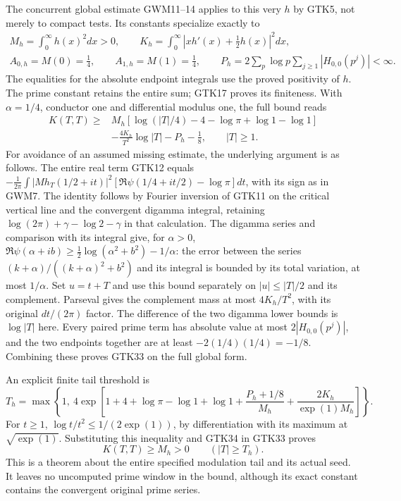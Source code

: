 The concurrent global estimate GWM11--14 applies to
this very $h$ by GTK5, not merely to compact tests.
Its constants specialize exactly to
\begin{equation}\tag{GTK32}
 \begin{gathered}
 M_h=\int_0^\infty h(x)^2dx>0,\qquad
 K_h=\int_0^\infty|xh'(x)+\tfrac12h(x)|^2dx,\\
 A_{0,h}=M(0)=\tfrac14,\qquad
 A_{1,h}=M(1)=\tfrac14,\qquad
 P_h=2\sum_p\log p\sum_{j\ge1}|H_{0,0}(p^j)|<\infty .
 \end{gathered}
\end{equation}
The equalities for the absolute endpoint integrals
use the proved positivity of $h$. The prime constant
retains the entire sum; GTK17 proves its finiteness.
With $\alpha=1/4$, conductor one and differential
modulus one, the full bound reads
\begin{equation}\tag{GTK33}
 \begin{split}
 K(T,T)\ge{}&
 M_h[\log(|T|/4)-4-\log\pi+\log1-\log1]\\
 &-\frac{4K_h}{T^2}\log|T|-P_h-\tfrac18 ,
                           \qquad |T|\ge1 .
 \end{split}
\end{equation}
For avoidance of an assumed missing estimate, the
underlying argument is as follows. The entire real
term GTK12 equals
$-\frac1{2\pi}\int |Mh_T(1/2+it)|^2
[\Re\psi(1/4+it/2)-\log\pi]dt$, with its sign as
in GWM7. The identity follows by Fourier inversion
of GTK11 on the critical vertical line and the
convergent digamma integral, retaining
$\log(2\pi)+\gamma-\log2-\gamma$ in that calculation.
The digamma series and comparison with its integral
give, for $\alpha>0$,
$\Re\psi(\alpha+ib)\ge
\frac12\log(\alpha^2+b^2)-1/\alpha$:
the error between the series
$(k+\alpha)/((k+\alpha)^2+b^2)$ and its integral
is bounded by its total variation, at most $1/\alpha$.
Set $u=t+T$ and use this bound separately on
$|u|\le|T|/2$ and its complement. Parseval gives the
complement mass at most $4K_h/T^2$, with its original
$dt/(2\pi)$ factor. The difference of the two
digamma lower bounds is $\log|T|$ here.
Every paired prime term has absolute value at most
$2|H_{0,0}(p^j)|$, and the two endpoints together
are at least $-2(1/4)(1/4)=-1/8$.
Combining these proves GTK33 on the full global form.

An explicit finite tail threshold is
\begin{equation}\tag{GTK34}
 T_h=\max\left\{1,\
 4\exp\left[
  1+4+\log\pi-\log1+\log1
  +\frac{P_h+1/8}{M_h}
  +\frac{2K_h}{\exp(1)M_h}\right]\right\}.
\end{equation}
For $t\ge1$, $\log t/t^2\le1/(2\exp(1))$,
by differentiation with its maximum at $\sqrt{\exp(1)}$.
Substituting this inequality and GTK34 in GTK33 proves
\begin{equation}\tag{GTK35}
 K(T,T)\ge M_h>0\qquad(|T|\ge T_h).
\end{equation}
This is a theorem about the entire specified modulation
tail and its actual seed. It leaves no uncomputed
prime window in the bound, although its exact constant
contains the convergent original prime series.

